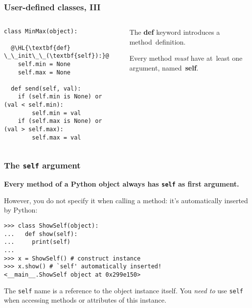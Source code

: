 \documentclass[english,serif,mathserif,xcolor=pdftex,dvipsnames,table]{beamer}
\begin{document}
\begin{frame}[fragile]
  \frametitle{User-defined classes, III}
  \begin{columns}[t]
    \begin{column}{0.5\textwidth}
\begin{lstlisting}
class MinMax(object):

  @\HL{\textbf{def} \_\_init\_\_(\textbf{self}):}@
    self.min = None
    self.max = None

  def send(self, val):
    if (self.min is None) or (val < self.min):
        self.min = val
    if (self.max is None) or (val > self.max):
        self.max = val
\end{lstlisting}
    \end{column}
    \begin{column}{0.5\textwidth}
      \raggedleft 
      The {\bf def} keyword introduces a method~definition.

      \+
      Every method \emph{must} have at~least one argument,
      named~{\bf self}.
    \end{column}
  \end{columns}
\end{frame}


\begin{frame}[fragile]
  \frametitle{The \texttt{self} argument}

  \textbf{Every method of a Python object always has \texttt{self}
    as first argument.}

  \+
  However, you do not specify it when calling a method: it's
  automatically inserted by Python:
\begin{lstlisting}
>>> class ShowSelf(object):
...   def show(self):
...     print(self)
... 
>>> x = ShowSelf() # construct instance
>>> x.show() # `self' automatically inserted!
<__main__.ShowSelf object at 0x299e150>
\end{lstlisting}

  \+ 
  The \texttt{self} name is a reference to the object instance
  itself.  You \emph{need to} use \texttt{self} when accessing methods
  or attributes of this instance.
\end{frame}
\end{document}
